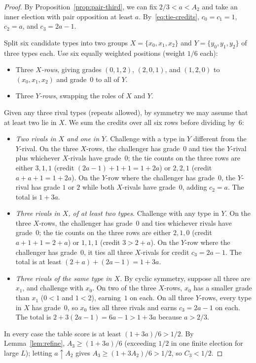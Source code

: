 \documentclass[11pt,letterpaper]{article}
\theoremstyle{cleanthm}
\begin{document}
\begin{proof}
By Proposition~\ref{prop:pair-third}, we can fix \(2/3<a<A_2\) and take an inner election with
pair opposition at least \(a\). By~\eqref{eq:tie-credits}, \(c_0=c_1=1\), \(c_2=a\), and
\(c_3=2a-1\).

Split six candidate types into two groups \(X=\{x_0,x_1,x_2\}\) and \(Y=\{y_0,y_1,y_2\}\) of three
types each. Use six equally weighted positions (weight \(1/6\) each):
\begin{itemize}
 \item Three \emph{\(X\)-rows}, giving grades \((0,1,2)\), \((2,0,1)\), and \((1,2,0)\) to
   \((x_0,x_1,x_2)\) and grade~\(0\) to all of \(Y\).
 \item Three \emph{\(Y\)-rows}, swapping the roles of \(X\) and \(Y\).
\end{itemize}
Given any three rival types (repeats allowed), by symmetry we may assume that at least two lie in
\(X\). We sum the credits over all six rows before dividing by~\(6\):
\begin{itemize}
 \item \emph{Two rivals in \(X\) and one in \(Y\).} Challenge with a type in \(Y\) different from
   the \(Y\)-rival. On the three \(X\)-rows, the challenger has grade~\(0\) and ties the
   \(Y\)-rival plus whichever \(X\)-rivals have grade~\(0\); the tie counts on the three rows are
   either \(3,1,1\) (credit \((2a-1)+1+1=1+2a\)) or \(2,2,1\) (credit \(a+a+1=1+2a\)). On the
   \(Y\)-row where the challenger has grade~\(0\), the \(Y\)-rival has grade \(1\) or \(2\) while
   both \(X\)-rivals have grade~\(0\), adding \(c_2=a\). The total is \(1+3a\).
 \item \emph{Three rivals in \(X\), of at least two types.} Challenge with any type in \(Y\). On
   the three \(X\)-rows, the challenger has grade~\(0\) and ties whichever rivals have
   grade~\(0\); the tie counts on the three rows are either \(2,1,0\) (credit \(a+1+1=2+a\)) or
   \(1,1,1\) (credit \(3>2+a\)). On the \(Y\)-row where the challenger has grade~\(0\), it ties
   all three \(X\)-rivals for credit \(c_3=2a-1\). The total is at least \((2+a)+(2a-1)=1+3a\).
 \item \emph{Three rivals of the same type in \(X\).} By cyclic symmetry, suppose all three are
   \(x_1\), and challenge with \(x_0\). On two of the three \(X\)-rows, \(x_0\) has a smaller
   grade than \(x_1\) (\(0<1\) and \(1<2\)), earning~\(1\) on each. On all three \(Y\)-rows, every
   type in \(X\) has grade~\(0\), so \(x_0\) ties all three rivals and earns \(c_3=2a-1\) on each.
   The total is \(2+3(2a-1)=6a-1>1+3a\) because \(a>2/3\).
\end{itemize}
In every case the table score is at least \((1+3a)/6>1/2\). By Lemma~\ref{lem:refine},
\(A_3\ge (1+3a)/6\) (exceeding \(1/2\) in one finite election for large \(L\)); letting
\(a\uparrow A_2\) gives \(A_3\ge (1+3A_2)/6>1/2\), so \(C_3<1/2\).
\end{proof}
\end{document}
